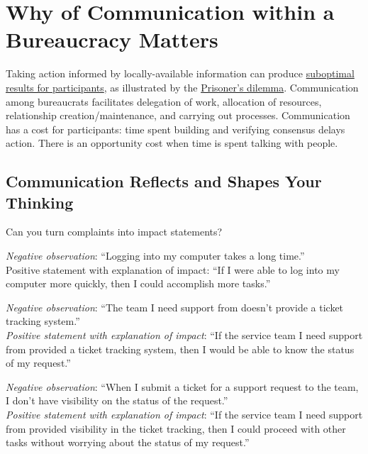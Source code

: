 \section{Why of Communication within a Bureaucracy Matters}

Taking action informed by locally-available information can produce \hyperref[sec:failure-to-comm]{suboptimal results for participants}, as illustrated by the \href{https://en.wikipedia.org/wiki/Prisoner\%27s\_dilemma}{Prisoner's dilemma}.
Communication among bureaucrats facilitates delegation of work, allocation of resources, relationship creation/maintenance, and carrying out processes. Communication has a cost for participants: time spent building and verifying consensus delays action. There is an opportunity cost when time is spent talking with people.




\subsection*{Communication Reflects and Shapes Your Thinking}

Can you turn complaints into impact statements? 

\textit{Negative observation}: ``Logging into my computer takes a long time.''\\
Positive statement with explanation of impact: ``If I were able to log into my computer more quickly, then I could accomplish more tasks.''

\textit{Negative observation}: ``The team I need support from doesn't provide a ticket tracking system.''\\
\textit{Positive statement with explanation of impact}: ``If the service team I need support from provided a ticket tracking system, then I would be able to know the status of my request.''

\textit{Negative observation}: ``When I submit a ticket for a support request to the team, I don't have visibility on the status of the request.''\\
\textit{Positive statement with explanation of impact}: ``If the service team I need support from provided visibility in the ticket tracking, then I could proceed with other tasks without worrying about the status of my request.''


